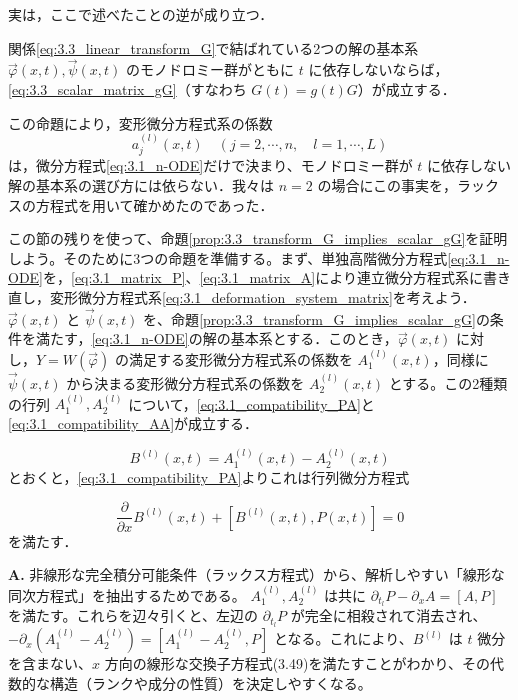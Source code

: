 実は，ここで述べたことの逆が成り立つ．

\begin{proposition}\label{prop:3.3_transform_G_implies_scalar_gG}
関係\eqref{eq:3.3_linear_transform_G}で結ばれている2つの解の基本系 $\vec{\varphi}(x,t), \vec{\psi}(x,t)$ のモノドロミー群がともに $t$ に依存しないならば，\eqref{eq:3.3_scalar_matrix_gG}（すなわち $G(t)=g(t)G$）が成立する．
\end{proposition}

この命題により，変形微分方程式系の係数
\[
  a_j^{(l)}(x,t) \quad (j=2,\cdots,n, \quad l=1,\cdots,L)
\]
は，微分方程式\eqref{eq:3.1_n-ODE}だけで決まり、モノドロミー群が $t$ に依存しない解の基本系の選び方には依らない．我々は $n=2$ の場合にこの事実を，ラックスの方程式を用いて確かめたのであった．

この節の残りを使って、命題\ref{prop:3.3_transform_G_implies_scalar_gG}を証明しよう。そのために3つの命題を準備する。まず、単独高階微分方程式\eqref{eq:3.1_n-ODE}を，\eqref{eq:3.1_matrix_P}、\eqref{eq:3.1_matrix_A}により連立微分方程式系に書き直し，変形微分方程式系\eqref{eq:3.1_deformation_system_matrix}を考えよう．$\vec{\varphi}(x,t)$ と $\vec{\psi}(x,t)$ を、命題\ref{prop:3.3_transform_G_implies_scalar_gG}の条件を満たす，\eqref{eq:3.1_n-ODE}の解の基本系とする．このとき，$\vec{\varphi}(x,t)$ に対し，$Y=W(\vec{\varphi})$ の満足する変形微分方程式系の係数を $A_1^{(l)}(x,t)$，同様に $\vec{\psi}(x,t)$ から決まる変形微分方程式系の係数を $A_2^{(l)}(x,t)$ とする。この2種類の行列 $A_1^{(l)}, A_2^{(l)}$ について，\eqref{eq:3.1_compatibility_PA}と\eqref{eq:3.1_compatibility_AA}が成立する．

\[
  B^{(l)}(x,t) = A_1^{(l)}(x,t) - A_2^{(l)}(x,t)
\]
とおくと，\eqref{eq:3.1_compatibility_PA}よりこれは行列微分方程式

\begin{equation}\label{eq:3.3_ODE_matrix_B}
  \frac{\partial}{\partial x} B^{(l)}(x,t) + \left[ B^{(l)}(x,t), P(x,t) \right] = 0
\end{equation}
を満たす．

\begin{Q}[なぜ2つの係数行列の差 $B^{(l)} = A_1^{(l)} - A_2^{(l)}$ を考え、方程式(3.49)を導出したのか？]
\textbf{A.} 非線形な完全積分可能条件（ラックス方程式）から、解析しやすい「線形な同次方程式」を抽出するためである。
$A_1^{(l)}, A_2^{(l)}$ は共に $\partial_{t_l} P - \partial_x A = [A, P]$ を満たす。これらを辺々引くと、左辺の $\partial_{t_l} P$ が完全に相殺されて消去され、$- \partial_x (A_1^{(l)} - A_2^{(l)}) = [A_1^{(l)} - A_2^{(l)}, P]$ となる。これにより、$B^{(l)}$ は $t$ 微分を含まない、$x$ 方向の線形な交換子方程式(3.49)を満たすことがわかり、その代数的な構造（ランクや成分の性質）を決定しやすくなる。
\end{Q}

